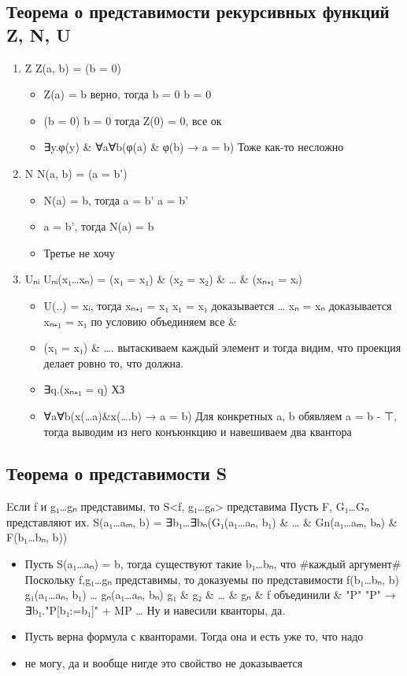 \documentclass[11pt]{article}
\begin{document}
\subsection{Теорема о представимости рекурсивных функций Z, N, U}
\label{sec-11-4}
\begin{enumerate}
\item Z
Z(a, b) = (b = 0)
\begin{itemize}
\item Z(a) = b верно, тогда b = 0
b = 0
\item (b = 0)
b = 0
тогда Z(0) = 0, все ок
\item ∃y.φ(y) \& ∀a∀b(φ(a) \& φ(b) → a = b)
Тоже как-то несложно
\end{itemize}
\item N
N(a, b) = (a = b')
\begin{itemize}
\item N(a) = b, тогда a = b'
a = b'
\item a = b', тогда
N(a) = b
\item Третье не хочу
\end{itemize}
\item Uₙᵢ
Uₙᵢ(x₁\ldots{}xₙ) = (x₁ = x₁) \& (x₂ = x₂) \& \ldots{} \& (xₙ₊₁ = xᵢ)
\begin{itemize}
\item U(..) = xᵢ, тогда xₙ₊₁ = x₁
x₁ = x₁ доказывается
\ldots{}
xₙ = xₙ доказывается
xₙ₊₁ = x₁ по условию
объединяем все \&
\item (x₁ = x₁) \& \ldots{}.
вытаскиваем каждый элемент и тогда видим, что
проекция делает ровно то, что должна.
\item ∃q.(xₙ₊₁ = q)
ХЗ
\item ∀a∀b(x(\ldots{}a)\&x(\ldots{}.b) → a = b)
Для конкретных a, b обявляем a = b - ⊤, тогда выводим
из него конъюнкцию и навешиваем два квантора
\end{itemize}
\end{enumerate}
\subsection{Теорема о представимости S}
\label{sec-11-5}
Eсли f и g₁\ldots{}gₙ представимы, то S<f, g₁\ldots{}gₙ> представима
Пусть F, G₁\ldots{}Gₙ представляют их.
S(a₁\ldots{}aₘ, b) = ∃b₁\ldots{}∃bₙ(G₁(a₁\ldots{}aₙ, b₁) \& \ldots{} \& Gn(a₁\ldots{}aₘ, bₙ)
\& F(b₁\ldots{}bₙ, b))
\begin{itemize}
\item Пусть S(a₁\ldots{}aₙ) = b, тогда существуют такие b₁\ldots{}bₙ, что \#каждый аргумент\#
Поскольку f,g₁\ldots{}gₙ представимы, то доказуемы по представимости
f(b₁\ldots{}bₙ, b)
g₁(a₁\ldots{}aₙ, b₁)
\ldots{}
gₙ(a₁\ldots{}aₙ, bₙ)
g₁ \& g₂ \& \ldots{} \& gₙ \& f    объединили \&     "P"
"P" → ∃b₁."P[b₁:=b₁]" + MP
\ldots{}
Ну и навесили кванторы, да.
\item Пусть верна формула с кванторами. Тогда она и есть уже то, что надо
\item не могу, да и вообще нигде это свойство не доказывается
\end{itemize}
\end{document}
